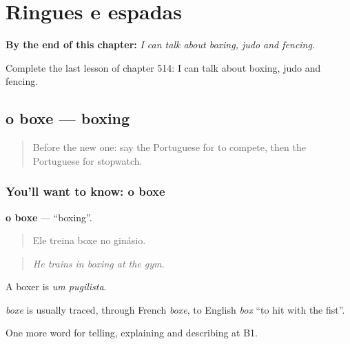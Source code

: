 
\chapter{Ringues e espadas}
\label{ch:pt-ringues-e-espadas}

\begin{chapteropening}
\textbf{By the end of this chapter:} \emph{I can talk about boxing, judo and fencing.}

Complete the last lesson of chapter 514: I can talk about boxing, judo and fencing.
\end{chapteropening}

\section[o boxe]{o boxe — boxing}

\label{lesson:PT-C514-boxe}



\begin{quote}
Before the new one: say the Portuguese for to compete, then the Portuguese for stopwatch.
\end{quote}

\subsection*{You'll want to know: o boxe}
\textbf{o boxe} — \textquotedblleft{}boxing\textquotedblright{}.

\begin{quote}
Ele treina boxe no ginásio.
\end{quote}

\begin{quote}
\emph{He trains in boxing at the gym.}
\end{quote}

A boxer is \emph{um pugilista}.

\begin{cousinweb}
\emph{boxe} is usually traced, through French \emph{boxe}, to English \emph{box} \textquotedblleft{}to hit with the fist\textquotedblright{}.
\end{cousinweb}

\begin{grammarlens}[title={What you've built}]
One more word for telling, explaining and describing at B1.
\end{grammarlens}

